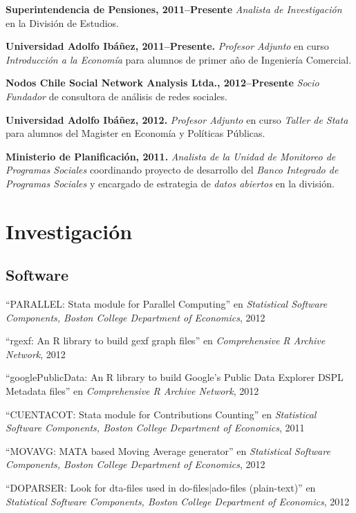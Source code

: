 \documentclass[letterpaper, 12pt]{article}
\renewenvironment{itemize}{
  \begin{list}{}{
    \setlength{\leftmargin}{0.45cm}
  }
}{
  \end{list}
}
\begin{document}
\begin{itemize}
\item \textbf{Superintendencia de Pensiones, 2011--Presente} \emph{Analista de Investigación} en la División de Estudios.
\item \textbf{Universidad Adolfo Ibáñez, 2011--Presente.} \emph{Profesor Adjunto} en curso \emph{Introducción a la Economía} para alumnos de primer año de Ingeniería Comercial.
\item \textbf{Nodos Chile Social Network Analysis Ltda., 2012--Presente} \emph{Socio Fundador} de consultora de an\'alisis de redes sociales.
\item \textbf{Universidad Adolfo Ibáñez, 2012.} \emph{Profesor Adjunto} en curso \emph{Taller de Stata} para alumnos del Magister en Economía y Políticas Públicas.
\item \textbf{Ministerio de Planificación, 2011.} \emph{Analista de la Unidad de Monitoreo de Programas Sociales} coordinando proyecto de desarrollo del \emph{Banco Integrado de Programas Sociales} y encargado de estrategia de \emph{datos abiertos} en la división.
\end{itemize}

\section*{Investigación}
\subsection*{Software}
\begin{itemize}
\item ``PARALLEL: Stata module for Parallel Computing'' en {\it Statistical Software Components, Boston College Department of Economics}, 2012
\item ``rgexf: An R library to build gexf graph files'' en {\it Comprehensive R Archive Network}, 2012
\item ``googlePublicData: An R library to build Google's Public Data Explorer DSPL Metadata files'' en {\it Comprehensive R Archive Network}, 2012
\item ``CUENTACOT: Stata module for Contributions Counting'' en {\it Statistical Software Components, Boston College Department of Economics}, 2011
\item ``MOVAVG: MATA based Moving Average generator'' en {\it Statistical Software Components, Boston College Department of Economics}, 2012
\item ``DOPARSER: Look for dta-files used in do-files|ado-files (plain-text)'' en {\it Statistical Software Components, Boston College Department of Economics}, 2012
\end{itemize}
\end{document}
